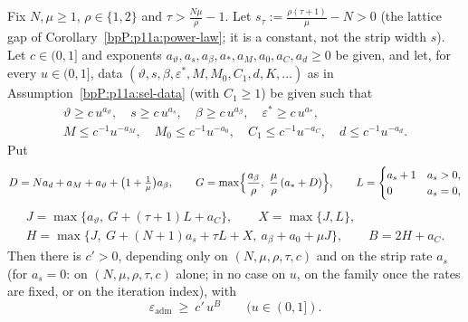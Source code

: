 \begin{proposition}\label{bpP:p11a:adm-budget}
Fix $N,\mu\ge1$, $\rho\in\{1,2\}$ and $\tau>\frac{N\mu}\rho-1$. Let $s_\tau:=\frac{\rho(\tau+1)}\mu-N>0$ (the lattice gap of Corollary~\ref{bpP:p11a:power-law}; it is a constant, not the strip width $s$). Let $c\in(0,1]$ and exponents $a_\vartheta,a_s,a_\beta,a_*,a_M,a_0,a_C,a_d\ge0$ be given, and let, for every $u\in(0,1]$, data $(\vartheta,s,\beta,\varepsilon^*,M,M_0,C_1,d,K,\ldots)$ as in Assumption~\ref{bpP:p11a:sel-data} (with $C_1\ge1$) be given such that
\begin{gather*}\vartheta\ge c\,u^{a_\vartheta},\quad s\ge c\,u^{a_s},\quad \beta\ge c\,u^{a_\beta},\quad\varepsilon^*\ge c\,u^{a_*},\\ M\le c^{-1}u^{-a_M},\quad M_0\le c^{-1}u^{-a_0},\quad C_1\le c^{-1}u^{-a_C},\quad d\le c^{-1}u^{-a_d}.\end{gather*}
Put
\[D=Na_d+a_M+a_\vartheta+\bigl(1+\tfrac1\mu\bigr)a_\beta,\qquad G=\max\Bigl\{\frac{a_\beta}\rho,\ \frac\mu\rho\,(a_*+D)\Bigr\},\qquad L=\begin{cases}a_s+1&a_s>0,\\0&a_s=0,\end{cases}\]
\begin{gather*}J=\max\{a_\vartheta,\ G+(\tau+1)L+a_C\},\qquad X=\max\{J,L\},\\ H=\max\bigl\{J,\ G+(N+1)a_s+\tau L+X,\ a_\beta+a_0+\mu J\bigr\},\qquad B=2H+a_C.\end{gather*}
Then there is $c'>0$, depending only on $(N,\mu,\rho,\tau,c)$ and on the strip rate $a_s$ (for $a_s=0$: on $(N,\mu,\rho,\tau,c)$ alone; in no case on $u$, on the family once the rates are fixed, or on the iteration index), with
\[\varepsilon_{\mathrm{adm}}\ \ge\ c'\,u^{B}\qquad(u\in(0,1]).\]
\end{proposition}
